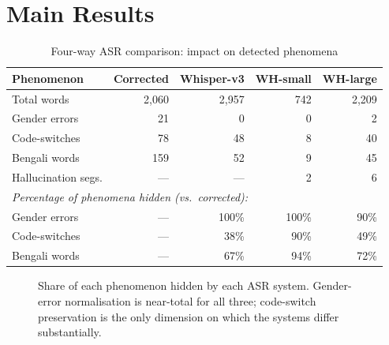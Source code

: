 \documentclass[11pt,a4paper]{report}
\begin{document}
\section{Main Results}

\begin{table}[H]
\centering
\caption{Four-way ASR comparison: impact on detected phenomena}
\label{tab:asr}
\begin{tabular}{lrrrr}
\toprule
\textbf{Phenomenon} & \textbf{Corrected} & \textbf{Whisper-v3} & \textbf{WH-small} & \textbf{WH-large} \\
\midrule
Total words         & 2,060 & 2,957 & 742   & 2,209 \\
Gender errors       & 21    & 0     & 0     & 2     \\
Code-switches       & 78    & 48    & 8     & 40    \\
Bengali words       & 159   & 52    & 9     & 45    \\
Hallucination segs. & ---   & ---   & 2     & 6     \\
\midrule
\multicolumn{5}{l}{\textit{Percentage of phenomena hidden (vs.\ corrected):}} \\
Gender errors       & ---   & 100\% & 100\% & 90\%  \\
Code-switches       & ---   & 38\%  & 90\%  & 49\%  \\
Bengali words       & ---   & 67\%  & 94\%  & 72\%  \\
\bottomrule
\end{tabular}
\end{table}

\begin{figure}[H]
\centering
{}
\caption{Share of each phenomenon hidden by each ASR system. Gender-error normalisation is near-total for all three; code-switch preservation is the only dimension on which the systems differ substantially.}
\label{fig:asr}
\end{figure}
\end{document}

